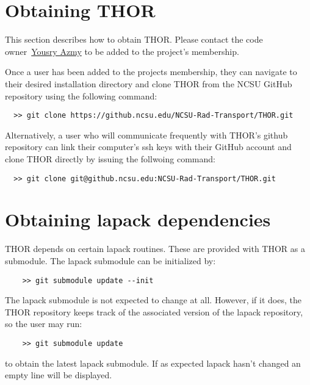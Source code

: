 \section{Obtaining THOR}

This section describes how to obtain THOR.
Please contact the code owner~\href{mailto:yyazmy@ncsu.edu}{Yousry Azmy} to be added to the project's membership.

Once a user has been added to the projects membership, they can navigate to their desired installation directory and clone THOR from the NCSU GitHub repository using the following command:
\begin{verbatim}
  >> git clone https://github.ncsu.edu/NCSU-Rad-Transport/THOR.git
\end{verbatim}
Alternatively, a user who will communicate frequently with THOR's github repository can link their computer's ssh keys with their GitHub account and clone THOR directly by issuing the follwoing command:
\begin{verbatim}
  >> git clone git@github.ncsu.edu:NCSU-Rad-Transport/THOR.git
\end{verbatim}

\section{Obtaining lapack dependencies}
THOR depends on certain lapack routines. These are provided with THOR as a submodule. The lapack submodule can be initialized by:
\begin{verbatim}
    >> git submodule update --init
\end{verbatim}
The lapack submodule is not expected to change at all. However, if it does, the THOR repository keeps track of the associated version of the lapack repository, so the user may run:
\begin{verbatim}
    >> git submodule update
\end{verbatim}
to obtain the latest lapack submodule. If as expected lapack hasn't changed an empty line will be displayed.

